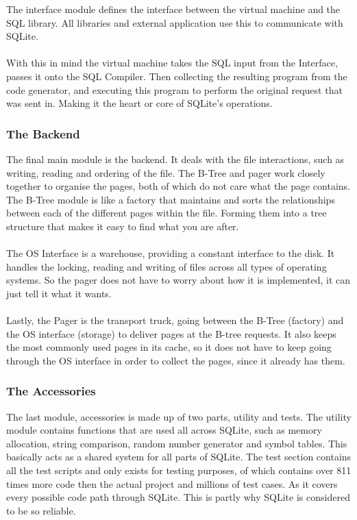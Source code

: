 The interface module defines the interface between the virtual machine and the SQL library. All libraries and external application use this to communicate with SQLite.
\\\\
With this in mind the virtual machine takes the SQL input from the Interface, passes it onto the SQL Compiler. Then collecting the resulting program from the code generator, and executing this program to perform the original request that was sent in. Making it the heart or core of SQLite's operations.

\subsubsection{The Backend}
\label{subsec:how_sqlite_backend}

The final main module is the backend. It deals with the file interactions, such as writing, reading and ordering of the file. The B-Tree and pager work closely together to organise the pages, both of which do not care what the page contains. The B-Tree module is like a factory that maintains and sorts the relationships between each of the different pages within the file. Forming them into a tree structure that makes it easy to find what you are after. 
\\\\
The OS Interface is a warehouse, providing a constant interface to the disk. It handles the locking, reading and writing of files across all types of operating systems. So the pager does not have to worry about how it is implemented, it can just tell it what it wants.
\\\\
Lastly, the Pager is the transport truck, going between the B-Tree (factory) and the OS interface (storage) to deliver pages at the B-tree requests. It also keeps the most commonly used pages in its cache, so it does not have to keep going through the OS interface in order to collect the pages, since it already has them.

\subsubsection{The Accessories}
\label{subsec:how_sqlite_accessories}

The last module, accessories is made up of two parts, utility and tests. The utility module contains functions that are used all across SQLite, such as memory allocation, string comparison, random number generator and symbol tables. This basically acts as a shared system for all parts of SQLite. The test section contains all the test scripts and only exists for testing purposes, of which contains over 811 times more code then the actual project and millions of test cases. As it covers every possible code path through SQLite. This is partly why SQLite is considered to be so reliable. 
\\\\
